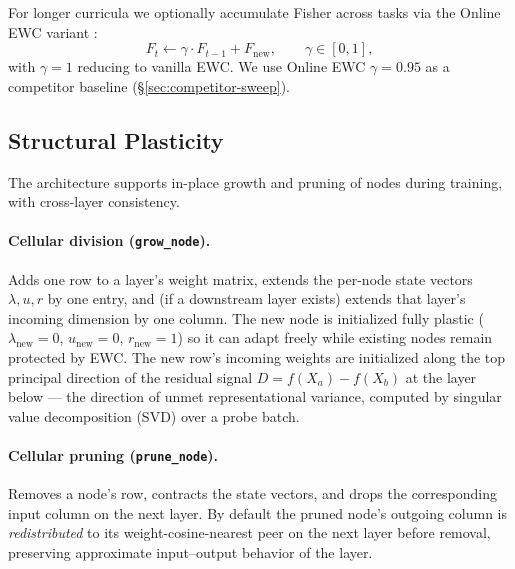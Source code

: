 \documentclass[11pt]{article}
\begin{document}
For longer curricula we optionally accumulate Fisher across tasks via
the Online EWC variant \citep{schwarz2018progress}:
\begin{equation}
  F_t \leftarrow \gamma \cdot F_{t-1} + F_{\text{new}},
  \qquad \gamma \in [0, 1],
\end{equation}
with $\gamma = 1$ reducing to vanilla EWC. We use Online EWC
$\gamma = 0.95$ as a competitor baseline (\S\ref{sec:competitor-sweep}).

\subsection{Structural Plasticity}
\label{sec:structural-plasticity}\label{app:structural-plasticity}

The architecture supports in-place growth and pruning of nodes during
training, with cross-layer consistency.

\paragraph{Cellular division (\texttt{grow\_node}).}
Adds one row to a layer's weight matrix, extends the per-node state
vectors $\lambda, u, r$ by one entry, and (if a downstream layer
exists) extends that layer's incoming dimension by one column. The new
node is initialized fully plastic ($\lambda_{\text{new}} = 0$,
$u_{\text{new}} = 0$, $r_{\text{new}} = 1$) so it can adapt freely
while existing nodes remain protected by EWC. The new row's incoming
weights are initialized along the top principal direction of the
residual signal $D = f(X_a) - f(X_b)$ at the layer below --- the
direction of unmet representational variance, computed by singular
value decomposition (SVD) over a probe batch.

\paragraph{Cellular pruning (\texttt{prune\_node}).}
Removes a node's row, contracts the state vectors, and drops the
corresponding input column on the next layer. By default the pruned
node's outgoing column is \emph{redistributed} to its
weight-cosine-nearest peer on the next layer before removal, preserving
approximate input--output behavior of the layer.
\end{document}
